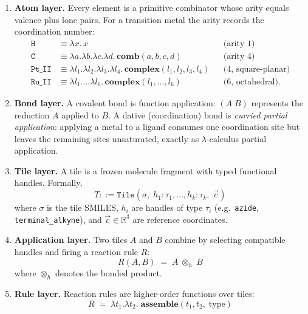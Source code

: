 \documentclass[10pt]{article}
\begin{document}
\begin{enumerate}
  \item \textbf{Atom layer.}  Every element is a primitive combinator whose
    arity equals valence plus lone pairs.  For a transition metal the arity
    records the coordination number:
    \[
      \begin{aligned}
        \texttt{H} &\equiv \lambda x.\,x                      &&\text{(arity 1)}\\
        \texttt{C} &\equiv \lambda a.\lambda b.\lambda c.\lambda d.\,\mathbf{comb}(a,b,c,d)
                                                                    &&\text{(arity 4)}\\
        \texttt{Pt\_II} &\equiv \lambda l_1.\lambda l_2.\lambda l_3.\lambda l_4.\,
                               \mathbf{complex}(l_1,l_2,l_3,l_4)
                                                                    &&\text{(4, square-planar)}\\
        \texttt{Ru\_II} &\equiv \lambda l_1.\dots\lambda l_6.\,
                               \mathbf{complex}(l_1,\dots,l_6)
                                                                    &&\text{(6, octahedral)} .
      \end{aligned}
    \]
  \item \textbf{Bond layer.}  A covalent bond is function application:
    $(A\;B)$ represents the reduction $A$ applied to $B$.  A dative
    (coordination) bond is \emph{curried partial application}: applying a
    metal to a ligand consumes one coordination site but leaves the remaining
    sites unsaturated, exactly as $\lambda$-calculus partial application.
  \item \textbf{Tile layer.}  A tile is a frozen molecule fragment with typed
    functional handles.  Formally,
    \[
      T ::= \texttt{Tile}(\sigma,\;h_1{:}\tau_1,\dots,h_k{:}\tau_k,\;\vec{c})
    \]
    where $\sigma$ is the tile SMILES, $h_i$ are handles of type $\tau_i$
    (e.g.\ \texttt{azide}, \texttt{terminal\_alkyne}), and $\vec{c}\in\mathbb{R}^3$
    are reference coordinates.
  \item \textbf{Application layer.}  Two tiles $A$ and $B$ combine by
    selecting compatible handles and firing a reaction rule $R$:
    \[
      R(A,B)\;=\;A\;\otimes_h\;B
    \]
    where $\otimes_h$ denotes the bonded product.
  \item \textbf{Rule layer.}  Reaction rules are higher-order functions over
    tiles:
    \[
      R \;=\; \lambda t_1.\lambda t_2.\; \mathbf{assemble}(t_1,t_2,\; \text{type})
\]
\end{enumerate}
\end{document}
